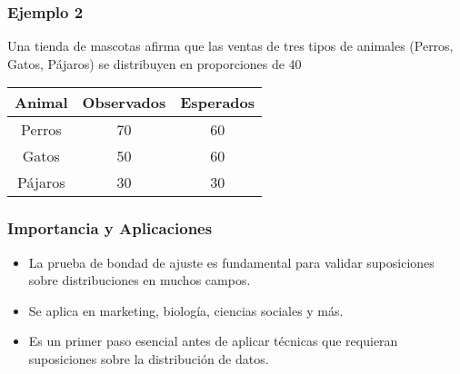 \documentclass[aspectratio=169]{beamer}
\begin{document}
\begin{frame}
\frametitle{Ejemplo 2}

Una tienda de mascotas afirma que las ventas de tres tipos de animales (Perros, Gatos, Pájaros) se distribuyen en proporciones de 40%

\begin{center}
\begin{tabular}{|c|c|c|}
\hline
Animal & Observados & Esperados \\
\hline
Perros & 70 & 60 \\
\hline
Gatos & 50 & 60 \\
\hline
Pájaros & 30 & 30 \\
\hline
\end{tabular}
\end{center}
\end{frame}

\begin{frame}
\frametitle{Importancia y Aplicaciones}
\begin{itemize}
    \item La prueba de bondad de ajuste es fundamental para validar suposiciones sobre distribuciones en muchos campos.
    \item Se aplica en marketing, biología, ciencias sociales y más.
    \item Es un primer paso esencial antes de aplicar técnicas que requieran suposiciones sobre la distribución de datos.
\end{itemize}
\end{frame}
\end{document}
